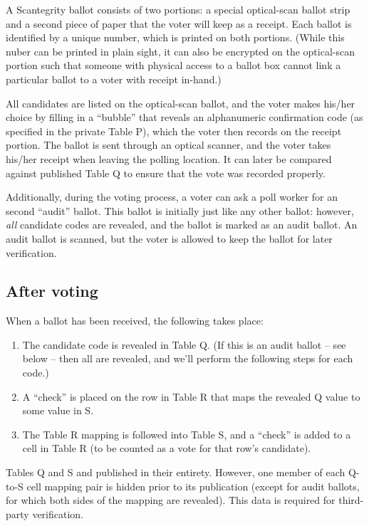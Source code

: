 \documentclass[10pt]{article}
\begin{document}
\begin{multicols}{2}
A Scantegrity ballot consists of two portions: a special optical-scan ballot strip and a second
piece of paper that the voter will keep as a receipt. Each ballot is identified by a unique number,
which is printed on both portions. (While this nuber can be printed in plain sight, it can also be
encrypted on the optical-scan portion such that someone with physical access to a ballot box cannot
link a particular ballot to a voter with receipt in-hand.)

All candidates are listed on the optical-scan ballot, and the voter makes his/her choice by filling
in a ``bubble'' that reveals an alphanumeric confirmation code (as specified in the private Table
P), which the voter then records on the receipt portion. The ballot is sent through an optical
scanner, and the voter takes his/her receipt when leaving the polling location. It can later be
compared against published Table Q to ensure that the vote was recorded properly.

Additionally, during the voting process, a voter can ask a poll worker for an second ``audit''
ballot. This ballot is initially just like any other ballot: however, \emph{all} candidate codes are
revealed, and the ballot is marked as an audit ballot. An audit ballot is scanned, but the voter is
allowed to keep the ballot for later verification.

\subsection{After voting}

When a ballot has been received, the following takes place:
\begin{enumerate}
	\item
		The candidate code is revealed in Table Q. (If this is an audit ballot -- see below -- then all
		are revealed, and we'll perform the following steps for each code.)
	\item
		A ``check'' is placed on the row in Table R that maps the revealed Q value to some value in S.
	\item
		The Table R mapping is followed into Table S, and a ``check'' is added to a cell in Table R
		(to be counted as a vote for that row's candidate).
\end{enumerate}

Tables Q and S and published in their entirety. However, one member of each Q-to-S cell mapping pair
is hidden prior to its publication (except for audit ballots, for which both sides of the mapping
are revealed). This data is required for third-party verification.


\end{multicols}
\end{document}
